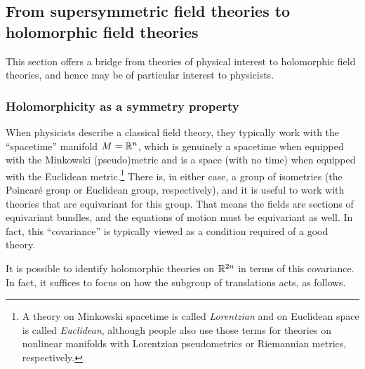 \documentclass[11pt]{amsart}
\begin{document}
%





\subsection{From supersymmetric field theories to holomorphic field theories}



This section offers a bridge from theories of physical interest to holomorphic field theories,
and hence may be of particular interest to physicists.

\subsubsection{Holomorphicity as a symmetry property}

When physicists describe a classical field theory,
they typically work with the ``spacetime'' manifold $M = \mathbb R^n$,
which is genuinely a spacetime when equipped with the Minkowski (pseudo)metric and is a space (with no time) when equipped with the Euclidean metric.\footnote{A theory on Minkowski spacetime is called {\it Lorentzian} and on Euclidean space is called {\it Euclidean},
although people also use those terms for theories on nonlinear manifolds with Lorentzian pseudometrics or Riemannian metrics, respectively.}
There is, in either case, a group of isometries (the Poincar\'e group or Euclidean group, respectively),
and it is useful to work with theories that are equivariant for this group.
That means the fields are sections of equivariant bundles,
and the equations of motion must be equivariant as well.
In fact, this ``covariance'' is typically viewed as a condition required of a good theory.

It is possible to identify holomorphic theories on $\mathbb R^{2n}$ in terms of this covariance.
In fact, it suffices to focus on how the subgroup of translations acts, as follows.
\end{document}
